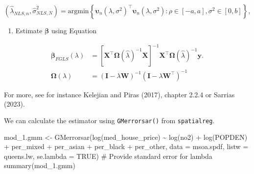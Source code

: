 \documentclass[
  letterpaper,
]{scrbook}
\newenvironment{Shaded}{\begin{snugshade}}{\end{snugshade}}
\newcommand{\AttributeTok}[1]{\textcolor[rgb]{0.40,0.45,0.13}{#1}}
\newcommand{\CommentTok}[1]{\textcolor[rgb]{0.37,0.37,0.37}{#1}}
\newcommand{\ConstantTok}[1]{\textcolor[rgb]{0.56,0.35,0.01}{#1}}
\newcommand{\FunctionTok}[1]{\textcolor[rgb]{0.28,0.35,0.67}{#1}}
\newcommand{\NormalTok}[1]{\textcolor[rgb]{0.00,0.23,0.31}{#1}}
\newcommand{\OtherTok}[1]{\textcolor[rgb]{0.00,0.23,0.31}{#1}}
\newcommand{\SpecialCharTok}[1]{\textcolor[rgb]{0.37,0.37,0.37}{#1}}
\providecommand{\tightlist}{%
  \setlength{\itemsep}{0pt}\setlength{\parskip}{0pt}}\usepackage{longtable,booktabs,array}
\begin{document}
\[
  (\widehat{\lambda}_{NLS, n}, \widehat{\sigma}^2_{NLS, N}) = \mathrm{argmin} \left\lbrace \boldsymbol{\mathbf{\upsilon}}_n(\lambda, \sigma^2)^\intercal\boldsymbol{\mathbf{\upsilon}}_n(\lambda, \sigma^2): \rho \in [-a, a], \sigma^2\in [0, b]\right\rbrace, 
\]

\begin{enumerate}
\def\labelenumi{\arabic{enumi})}
\setcounter{enumi}{3}
\tightlist
\item
  Estimate \(\boldsymbol{\mathbf{\beta}}\) using Equation
\end{enumerate}

\[
\begin{split}
\boldsymbol{\mathbf{\beta}}_{FGLS}(\lambda) &=\left[\boldsymbol{\mathbf{X}}^\intercal\boldsymbol{\mathbf{\Omega}}(\widehat{\lambda})^{-1}\boldsymbol{\mathbf{X}}\right]^{-1}\boldsymbol{\mathbf{X}}^\intercal\boldsymbol{\mathbf{\Omega}}(\widehat{\lambda})^{-1}\boldsymbol{\mathbf{y}}.\\
\boldsymbol{\mathbf{\Omega}}(\lambda) &= (\boldsymbol{\mathbf{I}} - \lambda\boldsymbol{\mathbf{W}})^{-1}(\boldsymbol{\mathbf{I}} - \lambda\boldsymbol{\mathbf{W}}^\intercal)^{-1}
\end{split}
\]

For more, see for instance Kelejian and Piras (2017), chapter 2.2.4 or
Sarrias (2023).

We can calculate the estimator using \texttt{GMerrorsar()} from
\texttt{spatialreg}.

\begin{Shaded}
\begin{Highlighting}[]
\NormalTok{mod\_1.gmm }\OtherTok{\textless{}{-}} \FunctionTok{GMerrorsar}\NormalTok{(}\FunctionTok{log}\NormalTok{(med\_house\_price) }\SpecialCharTok{\textasciitilde{}} \FunctionTok{log}\NormalTok{(no2) }\SpecialCharTok{+} \FunctionTok{log}\NormalTok{(POPDEN) }\SpecialCharTok{+} 
\NormalTok{                     per\_mixed }\SpecialCharTok{+}\NormalTok{ per\_asian }\SpecialCharTok{+}\NormalTok{ per\_black }\SpecialCharTok{+}\NormalTok{ per\_other,  }
                   \AttributeTok{data =}\NormalTok{ msoa.spdf, }
                   \AttributeTok{listw =}\NormalTok{ queens.lw,}
                   \AttributeTok{se.lambda =} \ConstantTok{TRUE}\NormalTok{) }\CommentTok{\# Provide standard error for lambda}
\FunctionTok{summary}\NormalTok{(mod\_1.gmm)}
\end{Highlighting}
\end{Shaded}
\end{document}
